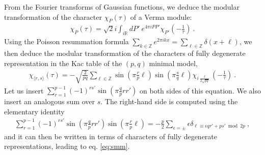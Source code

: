 \documentclass[12pt, a4paper]{article}
\theoremstyle{break}
\begin{document}
From the Fourier transforms of Gaussian functions, we deduce the modular transformation of the character $\chi_{P}(\tau)$ of a Verma module: 
 \begin{align}
  \chi_P(\tau) = \sqrt{2}i\int_{i\mathbb{R}} dP'\ e^{4\pi iPP'} \chi_{P'}(-\tfrac{1}{\tau})\ . 
 \end{align}
Using the Poisson resummation formula $\sum_{k\in\mathbb{Z}} e^{2\pi ikx} = \sum_{\ell\in\mathbb{Z}} \delta(x+\ell)$, we then deduce the modular transformation of the characters of fully degenerate representation in the Kac table of the $(p, q)$ minimal model,
\begin{align}
 \chi_{\langle r,s\rangle}(\tau) = 
 -\sqrt{\frac{2}{pq}}\sum_{\ell\in\mathbb{Z}} 
 \sin\left(\pi\frac{r}{p}\ell\right) 
 \sin\left(\pi\frac{s}{q}\ell\right)
 \chi_{i\frac{\ell}{2\sqrt{pq}}}(-\tfrac{1}{\tau})\ .
 \label{eq:chs}
\end{align}
Let us insert $\sum_{r=1}^{p-1} (-1)^{rs'}\sin\left(\pi\frac{q}{p}rr'\right)$ on both sides of this equation. We also insert an analogous sum over $s$. The right-hand side is computed using the elementary identity
\begin{align}
 \sum_{r=1}^{p-1} (-1)^{rs'}\sin\left(\pi\frac{q}{p}rr'\right)\sin\left(\pi\frac{r}{p}\ell\right) 
 = -\frac{p}{2}\sum_{\epsilon =\pm} \epsilon \delta_{\ell\equiv\epsilon qr'+ps'\bmod 2p}\ ,
\end{align}
and it can then be written in terms of characters of fully degenerate representations, leading to 
eq. \eqref{eq:smm}.



\hypersetup{linkcolor=black}

\renewcommand{\listtheoremname}{List of Exercises}
\listoftheorems[ignoreall, show={exo}]

\hypersetup{linkcolor=blue}





%
\end{document}
